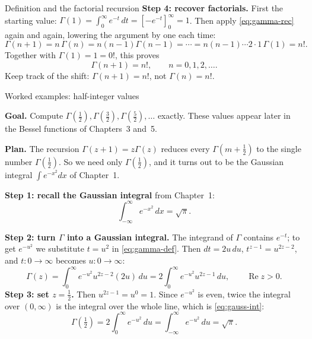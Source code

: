 \documentclass[11pt]{beamer}
\begin{document}
\begin{frame}[allowframebreaks=1.00]{Definition and the factorial recursion}
\textbf{Step 4: recover factorials.}  First the starting value:
\(\Gamma(1)=\int_0^\infty e^{-t}\,dt=\left[-e^{-t}\right]_{0}^{\infty}=1\).
Then apply \eqref{eq:gamma-rec} again and again, lowering the argument by one each time:
\[
  \Gamma(n+1)=n\,\Gamma(n)=n(n-1)\Gamma(n-1)=\cdots=n(n-1)\cdots2\cdot1\,\Gamma(1)=n!.
\]
Together with \(\Gamma(1)=1=0!\), this proves
\begin{equation}
  \Gamma(n+1)=n!,
  \qquad n=0,1,2,\dots .
  \label{eq:gamma-fact}
\end{equation}
Keep track of the shift: \(\Gamma(n+1)=n!\), not \(\Gamma(n)=n!\).
\end{frame}


\begin{frame}[allowframebreaks=1.00]{Worked examples: half-integer values}
\footnotesize

\textbf{Goal.} Compute \(\Gamma(\tfrac12),\Gamma(\tfrac32),\Gamma(\tfrac52),\dots\) exactly.
These values appear later in the Bessel functions of Chapters~3 and~5.

\textbf{Plan.} The recursion \(\Gamma(z+1)=z\Gamma(z)\) reduces every \(\Gamma(m+\tfrac12)\) to the
single number \(\Gamma(\tfrac12)\). So we need only \(\Gamma(\tfrac12)\), and it turns out to be the
Gaussian integral \(\int e^{-x^2}dx\) of Chapter~1.

\textbf{Step 1: recall the Gaussian integral} from Chapter~1:
\begin{equation}
  \int_{-\infty}^{\infty}e^{-x^2}\,dx=\sqrt\pi .
  \label{eq:gauss-int}
\end{equation}



\textbf{Step 2: turn \(\Gamma\) into a Gaussian integral.} The integrand of \(\Gamma\) contains
\(e^{-t}\); to get \(e^{-u^2}\) we substitute \(t=u^2\) in \eqref{eq:gamma-def}. Then
\(dt=2u\,du\), \(t^{z-1}=u^{2z-2}\), and \(t:0\to\infty\) becomes \(u:0\to\infty\):
\begin{equation}
  \Gamma(z)=\int_0^\infty e^{-u^2}u^{2z-2}(2u)\,du
  =2\int_0^\infty e^{-u^2}u^{2z-1}\,du,
  \qquad \operatorname{Re}z>0.
  \label{eq:gamma-gauss}
\end{equation}
\textbf{Step 3: set \(z=\tfrac12\).} Then \(u^{2z-1}=u^0=1\). Since \(e^{-u^2}\) is even, twice the
integral over \((0,\infty)\) is the integral over the whole line, which is \eqref{eq:gauss-int}:
\begin{equation}
  \Gamma\left(\tfrac12\right)=2\int_0^\infty e^{-u^2}\,du
  =\int_{-\infty}^{\infty}e^{-u^2}\,du=\sqrt\pi.
  \label{eq:gamma-half}
\end{equation}



\end{frame}
\end{document}
